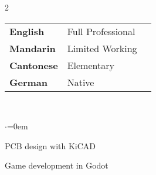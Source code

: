 \documentclass[grey]{hipstercv}
\newlength{\leftcolwidth}
\begin{document}
\begin{paracol}{2}
{\begin{minipage}[t]{0.3\textwidth}
\color{labelcolour}{OS:} \hspace{0.5em} \hspace{0.5em}  
 
\bigskip

\bigskip


\begin{minipage}[t]{\leftcolwidth}
\begin{tabular}{l | ll}
\textbf{English} & {\phantom{x}\footnotesize Full Professional} \\
\textbf{Mandarin} & {\phantom{x}\footnotesize Limited Working} \\
\textbf{Cantonese} & {\phantom{x}\footnotesize Elementary} \\
\textbf{German} & {\phantom{x}\footnotesize Native} \\
\end{tabular}
\end{minipage}

\bigskip

 \\

\begin{list}{$\cdot$}{\leftmargin=0em}\setlength{\itemsep}{-0.em} \vspace{-0.em}
    \item PCB design with KiCAD 
    \item Game development in Godot
\end{list}

\bigskip
\vspace{10em}



    
\end{minipage}






\phantom{turn the page}

}
\end{paracol}
\end{document}

